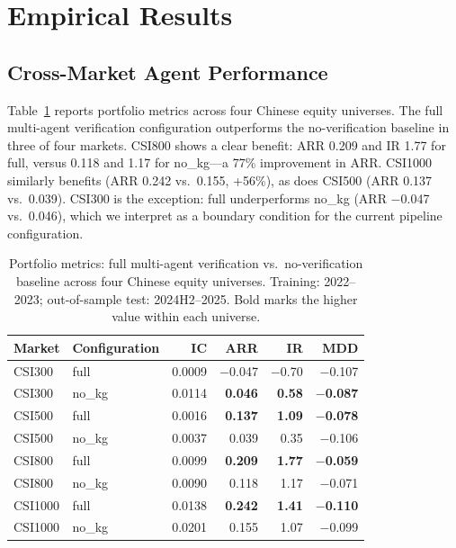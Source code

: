 \documentclass[sigconf]{acmart}
\begin{document}
\section{Empirical Results}

\subsection{Cross-Market Agent Performance}

Table~\ref{tab:cross} reports portfolio metrics across four Chinese equity universes. The full multi-agent verification configuration outperforms the no-verification baseline in three of four markets. CSI800 shows a clear benefit: ARR 0.209 and IR 1.77 for full, versus 0.118 and 1.17 for no\_kg---a 77\% improvement in ARR. CSI1000 similarly benefits (ARR 0.242 vs.\ 0.155, +56\%), as does CSI500 (ARR 0.137 vs.\ 0.039). CSI300 is the exception: full underperforms no\_kg (ARR $-$0.047 vs.\ 0.046), which we interpret as a boundary condition for the current pipeline configuration.

\begin{table}[t]
\caption{Portfolio metrics: full multi-agent verification vs.\ no-verification baseline across four Chinese equity universes. Training: 2022--2023; out-of-sample test: 2024H2--2025. Bold marks the higher value within each universe.}
\label{tab:cross}
\centering
\begin{tabular}{l l r r r r}
\toprule
Market & Configuration & IC & ARR & IR & MDD \\
\midrule
CSI300 & full & 0.0009 & $-$0.047 & $-$0.70 & $-$0.107 \\
CSI300 & no\_kg & 0.0114 & \textbf{0.046} & \textbf{0.58} & \textbf{$-$0.087} \\
\midrule
CSI500 & full & 0.0016 & \textbf{0.137} & \textbf{1.09} & \textbf{$-$0.078} \\
CSI500 & no\_kg & 0.0037 & 0.039 & 0.35 & $-$0.106 \\
\midrule
CSI800 & full & 0.0099 & \textbf{0.209} & \textbf{1.77} & \textbf{$-$0.059} \\
CSI800 & no\_kg & 0.0090 & 0.118 & 1.17 & $-$0.071 \\
\midrule
CSI1000 & full & 0.0138 & \textbf{0.242} & \textbf{1.41} & \textbf{$-$0.110} \\
CSI1000 & no\_kg & 0.0201 & 0.155 & 1.07 & $-$0.099 \\
\bottomrule
\end{tabular}
\end{table}
\end{document}
